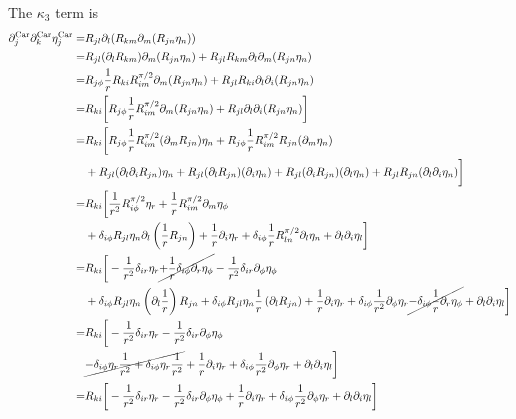 \documentclass[aps,prl,preprint]{revtex4-2}
\begin{document}
The $\kappa_3$ term is
\begin{align}
    \partial_j^\text{Car}\partial_k^\text{Car}\eta_j^\text{Car}=&R_{jl}\partial_l(R_{km}\partial_m(R_{jn}\eta_n))\\
    =&R_{jl}(\partial_lR_{km})\partial_m(R_{jn}\eta_n) + R_{jl}R_{km}\partial_l\partial_m(R_{jn}\eta_n)\\
    =&R_{j\phi}\frac{1}{r}R_{ki}R^{\pi/2}_{im}\partial_m(R_{jn}\eta_n)
     + R_{jl}R_{ki}\partial_l\partial_i(R_{jn}\eta_n)\\
    =&R_{ki}\bigg[R_{j\phi}\frac{1}{r}R^{\pi/2}_{im}\partial_m(R_{jn}\eta_n)
     + R_{jl}\partial_l\partial_i(R_{jn}\eta_n)\bigg]\\
    =&R_{ki}\bigg[R_{j\phi}\frac{1}{r}R^{\pi/2}_{im}(\partial_mR_{jn})\eta_n
    +R_{j\phi}\frac{1}{r}R^{\pi/2}_{im}R_{jn}(\partial_m\eta_n)\\
    &+R_{jl}(\partial_l\partial_iR_{jn})\eta_n+R_{jl}(\partial_lR_{jn})(\partial_i\eta_n)
    +R_{jl}(\partial_iR_{jn})(\partial_l\eta_n)+R_{jl}R_{jn}(\partial_l\partial_i\eta_n)\bigg]\nonumber\\
    =&R_{ki}\bigg[\frac{1}{r^2}R^{\pi/2}_{i\phi}\eta_r+\frac{1}{r}R^{\pi/2}_{im}\partial_m\eta_\phi\nonumber\\
    &+\delta_{i\phi}R_{jl}\eta_n\partial_l\left(\frac{1}{r}R_{jn}\right) + \frac{1}{r}\partial_i\eta_r
    +\delta_{i\phi}\frac{1}{r}R^{\pi/2}_{ln}\partial_l\eta_n + \partial_l\partial_i\eta_l\bigg]\nonumber\\
    =&R_{ki}\bigg[-\frac{1}{r^2}\delta_{ir}\eta_r \cancel{+ \frac{1}{r}\delta_{i\phi}\partial_r\eta_\phi}
    -\frac{1}{r^2}\delta_{ir}\partial_\phi\eta_\phi\nonumber\\
    &+\delta_{i\phi}R_{jl}\eta_n\left(\partial_l\frac{1}{r}\right)R_{jn}
    +\delta_{i\phi}R_{jl}\eta_n\frac{1}{r}\left(\partial_lR_{jn}\right) + \frac{1}{r}\partial_i\eta_r
    +\delta_{i\phi}\frac{1}{r^2}\partial_\phi\eta_r\cancel{-\delta_{i\phi}\frac{1}{r}\partial_r\eta_\phi}
    + \partial_l\partial_i\eta_l\bigg]\nonumber\\
    =&R_{ki}\bigg[-\frac{1}{r^2}\delta_{ir}\eta_r
    -\frac{1}{r^2}\delta_{ir}\partial_\phi\eta_\phi\nonumber\\
    &\cancel{-\delta_{i\phi}\eta_r\frac{1}{r^2} +\delta_{i\phi}\eta_r\frac{1}{r^2}} + \frac{1}{r}\partial_i\eta_r
    +\delta_{i\phi}\frac{1}{r^2}\partial_\phi\eta_r
    + \partial_l\partial_i\eta_l\bigg]\nonumber\\
    =&R_{ki}\bigg[-\frac{1}{r^2}\delta_{ir}\eta_r
    -\frac{1}{r^2}\delta_{ir}\partial_\phi\eta_\phi + \frac{1}{r}\partial_i\eta_r
    +\delta_{i\phi}\frac{1}{r^2}\partial_\phi\eta_r + \partial_l\partial_i\eta_l\bigg]
\end{align}
\end{document}
